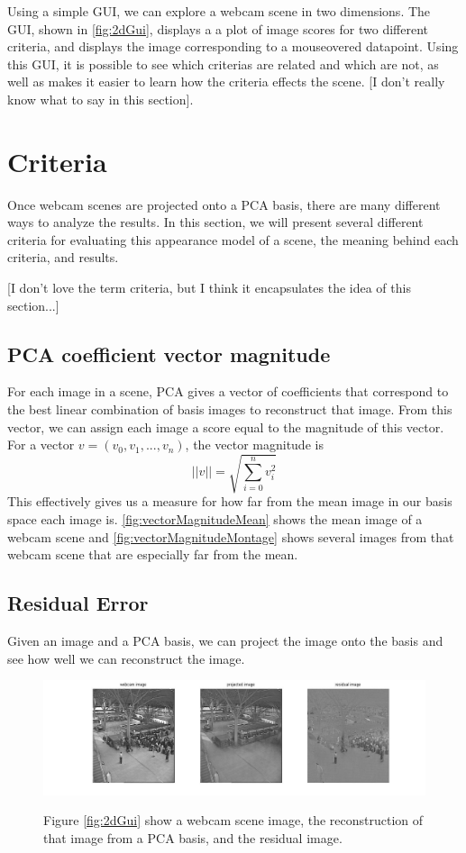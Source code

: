 Using a simple GUI, we can explore a webcam scene in two dimensions.  The GUI, shown in \ref{fig:2dGui}, displays a a plot of image scores for two different criteria, and displays the image corresponding to a mouseovered datapoint.  Using this GUI, it is possible to see which criterias are related and which are not, as well as makes it easier to learn how the criteria effects the scene. [I don't really know what to say in this section].


\section{Criteria}

Once webcam scenes are projected onto a PCA basis, there are many different ways to analyze the results.  In this section, we will present several different criteria for evaluating this appearance model of a scene, the meaning behind each criteria, and results.

[I don't love the term criteria, but I think it encapsulates the idea of this section...]

\subsection{PCA coefficient vector magnitude}

For each image in a scene, PCA gives a vector of coefficients that correspond to the best linear combination of basis images to reconstruct that image.  From this vector, we can assign each image a score equal to the magnitude of this vector.  For a vector $v = (v_0, v_1, ..., v_n)$, the vector magnitude is $$||v||=\sqrt{\sum_{i=0}^nv_i^2}$$This effectively gives us a measure for how far from the mean image in our basis space each image is.   \ref{fig:vectorMagnitudeMean} shows the mean image of a webcam scene and \ref{fig:vectorMagnitudeMontage} shows several images from that webcam scene that are especially far from the mean.

\subsection{Residual Error}

Given an image and a PCA basis, we can project the image onto the basis and see how well we can reconstruct the image.

\begin{figure}%
	\centering
		\includegraphics[width=1\textwidth]{figures/residualReconstruction.jpg}
	\label{fig:residualReconstruction}
	
		\caption[Residual Reconstruction.]{Figure \ref{fig:2dGui} show a webcam scene image, the reconstruction of that image from a PCA basis, and the residual image.}
\end{figure}

